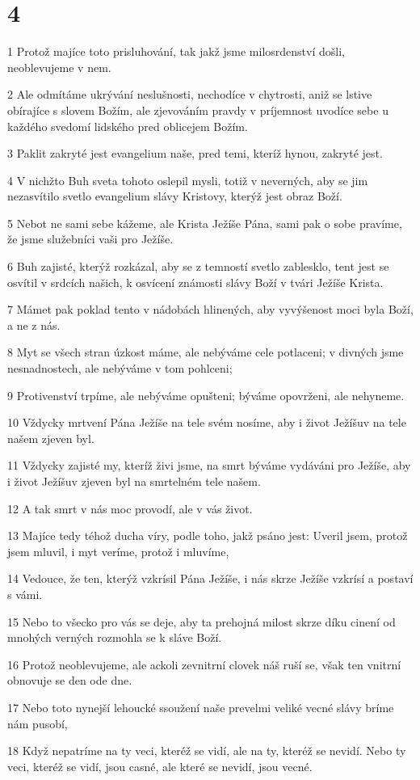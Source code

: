 \chapter{4}

\par 1 Protož majíce toto prisluhování, tak jakž jsme milosrdenství došli, neoblevujeme v nem.
\par 2 Ale odmítáme ukrývání neslušnosti, nechodíce v chytrosti, aniž se lstive obírajíce s slovem Božím, ale zjevováním pravdy v príjemnost uvodíce sebe u každého svedomí lidského pred oblicejem Božím.
\par 3 Paklit zakryté jest evangelium naše, pred temi, kteríž hynou, zakryté jest.
\par 4 V nichžto Buh sveta tohoto oslepil mysli, totiž v neverných, aby se jim nezasvítilo svetlo evangelium slávy Kristovy, kterýž jest obraz Boží.
\par 5 Nebot ne sami sebe kážeme, ale Krista Ježíše Pána, sami pak o sobe pravíme, že jsme služebníci vaši pro Ježíše.
\par 6 Buh zajisté, kterýž rozkázal, aby se z temností svetlo zablesklo, tent jest se osvítil v srdcích našich, k osvícení známosti slávy Boží v tvári Ježíše Krista.
\par 7 Mámet pak poklad tento v nádobách hlinených, aby vyvýšenost moci byla Boží, a ne z nás.
\par 8 Myt se všech stran úzkost máme, ale nebýváme cele potlaceni; v divných jsme nesnadnostech, ale nebýváme v tom pohlceni;
\par 9 Protivenství trpíme, ale nebýváme opušteni; býváme opovrženi, ale nehyneme.
\par 10 Vždycky mrtvení Pána Ježíše na tele svém nosíme, aby i život Ježíšuv na tele našem zjeven byl.
\par 11 Vždycky zajisté my, kteríž živi jsme, na smrt býváme vydáváni pro Ježíše, aby i život Ježíšuv zjeven byl na smrtelném tele našem.
\par 12 A tak smrt v nás moc provodí, ale v vás život.
\par 13 Majíce tedy téhož ducha víry, podle toho, jakž psáno jest: Uveril jsem, protož jsem mluvil, i myt veríme, protož i mluvíme,
\par 14 Vedouce, že ten, kterýž vzkrísil Pána Ježíše, i nás skrze Ježíše vzkrísí a postaví s vámi.
\par 15 Nebo to všecko pro vás se deje, aby ta prehojná milost skrze díku cinení od mnohých verných rozmohla se k sláve Boží.
\par 16 Protož neoblevujeme, ale ackoli zevnitrní clovek náš ruší se, však ten vnitrní obnovuje se den ode dne.
\par 17 Nebo toto nynejší lehoucké ssoužení naše prevelmi veliké vecné slávy bríme nám pusobí,
\par 18 Když nepatríme na ty veci, kteréž se vidí, ale na ty, kteréž se nevidí. Nebo ty veci, kteréž se vidí, jsou casné, ale které se nevidí, jsou vecné.

